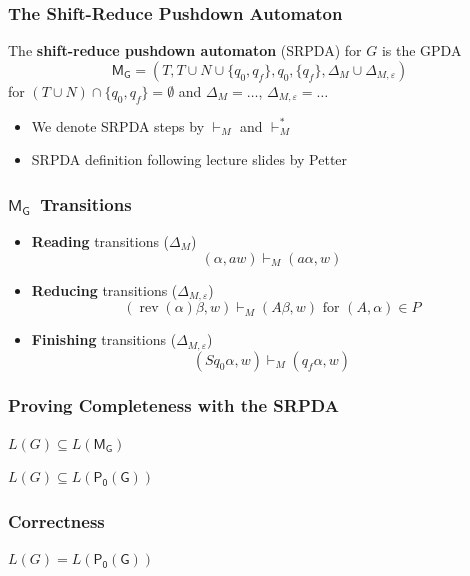 \documentclass{beamer}
\newcommand{\concept}[1]{\textbf{#1}}
\newcommand{\sym}{\ensuremath{T \cup N}}
\newcommand{\parser}{\ensuremath{\mathsf{P_0(G)}}}
\newcommand{\srpda}{\ensuremath{\mathsf{M_G}}}
\DeclareMathOperator{\rev}{rev}
\begin{document}
\begin{frame}
  \frametitle{The Shift-Reduce Pushdown Automaton}
\begin{definition}
  The \concept{shift-reduce pushdown automaton} (SRPDA) for $G$ is the
  GPDA 
  \[ \srpda = (T, \sym \cup \{q_0, q_f\}, q_0, \{q_f\},
    \varDelta_M \cup \varDelta_{M, \varepsilon}) \]
   for $(\sym) \cap \{q_0, q_f\} = \emptyset$ and $\varDelta_M = \ldots$,
   $\varDelta_{M, \varepsilon} = \ldots$
\end{definition}
\begin{itemize}
  \item We denote SRPDA steps by $\vdash_M$ and $\vdash_M^*$
  \item SRPDA definition following lecture slides by Petter
\end{itemize}
\end{frame}

\begin{frame}
  \frametitle{\srpda\ Transitions}
  \begin{itemize}
    \item \concept{Reading} transitions ($\varDelta_M$)
    \[ (\alpha, aw) \vdash_M (a \alpha, w) \]
    \item \concept{Reducing} transitions ($\varDelta_{M, \varepsilon}$)
      \[ (\rev(\alpha)\beta, w) \vdash_M (A \beta, w) \text{ for } (A, \alpha) \in P \]
    \item \concept{Finishing} transitions ($\varDelta_{M, \varepsilon}$)
      \[ (S q_0 \alpha, w) \vdash_M (q_f \alpha, w) \]
  \end{itemize}
\end{frame}

\begin{frame}
  \frametitle{Proving Completeness with the SRPDA}
  \begin{lemma}
    $L(G) \subseteq L(\srpda)$
  \end{lemma}
  \begin{theorem}
    $L(G) \subseteq L(\parser)$
  \end{theorem}
\end{frame}

\begin{frame}
  \frametitle{Correctness}
  \begin{theorem}
    $L(G) = L(\parser)$
  \end{theorem}
\end{frame}
\end{document}
